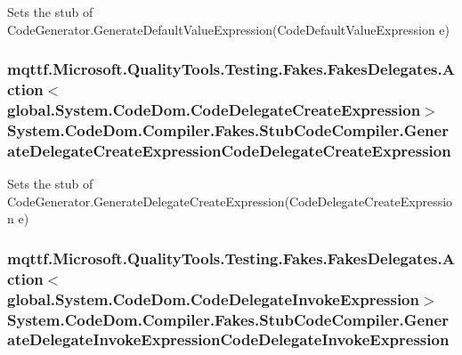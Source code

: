 Sets the stub of Code\-Generator.\-Generate\-Default\-Value\-Expression(\-Code\-Default\-Value\-Expression e)

\hypertarget{class_system_1_1_code_dom_1_1_compiler_1_1_fakes_1_1_stub_code_compiler_aecd4f072fc27aabf582d687bdfb5cc81}{
\subsubsection[{Generate\-Delegate\-Create\-Expression\-Code\-Delegate\-Create\-Expression}]{\setlength{\rightskip}{0pt plus 5cm}mqttf.\-Microsoft.\-Quality\-Tools.\-Testing.\-Fakes.\-Fakes\-Delegates.\-Action$<$global.\-System.\-Code\-Dom.\-Code\-Delegate\-Create\-Expression$>$ System.\-Code\-Dom.\-Compiler.\-Fakes.\-Stub\-Code\-Compiler.\-Generate\-Delegate\-Create\-Expression\-Code\-Delegate\-Create\-Expression}}\label{class_system_1_1_code_dom_1_1_compiler_1_1_fakes_1_1_stub_code_compiler_aecd4f072fc27aabf582d687bdfb5cc81}


Sets the stub of Code\-Generator.\-Generate\-Delegate\-Create\-Expression(\-Code\-Delegate\-Create\-Expression e)

\hypertarget{class_system_1_1_code_dom_1_1_compiler_1_1_fakes_1_1_stub_code_compiler_a226319e4408d1be11e331dd781d8e0dc}{
\subsubsection[{Generate\-Delegate\-Invoke\-Expression\-Code\-Delegate\-Invoke\-Expression}]{\setlength{\rightskip}{0pt plus 5cm}mqttf.\-Microsoft.\-Quality\-Tools.\-Testing.\-Fakes.\-Fakes\-Delegates.\-Action$<$global.\-System.\-Code\-Dom.\-Code\-Delegate\-Invoke\-Expression$>$ System.\-Code\-Dom.\-Compiler.\-Fakes.\-Stub\-Code\-Compiler.\-Generate\-Delegate\-Invoke\-Expression\-Code\-Delegate\-Invoke\-Expression}}\label{class_system_1_1_code_dom_1_1_compiler_1_1_fakes_1_1_stub_code_compiler_a226319e4408d1be11e331dd781d8e0dc}


